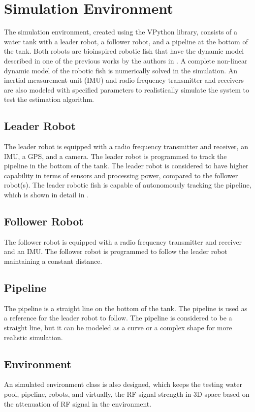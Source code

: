 \documentclass{ifacconf}
\begin{document}
\section{Simulation Environment}
The simulation environment, created using the VPython library, consists of a water tank with a leader robot, a follower robot, and a pipeline at the bottom of the tank. Both robots are bioinspired robotic fish that have the dynamic model described in one of the previous works by the authors in \cite{Masood2025}. A complete non-linear dynamic model of the robotic fish is numerically solved in the simulation. An inertial measurement unit (IMU) and radio frequency transmitter and receivers are also modeled with specified parameters to realistically simulate the system to test the estimation algorithm. 

\subsection{Leader Robot}
The leader robot is equipped with a radio frequency transmitter and receiver, an IMU, a GPS, and a camera. The leader robot is programmed to track the pipeline in the bottom of the tank. The leader robot is considered to have higher capability in terms of sensors and processing power, compared to the follower robot(s). The leader robotic fish is capable of autonomously tracking the pipeline, which is shown in detail in \cite{Masood2025}. 
\subsection{Follower Robot}
The follower robot is equipped with a radio frequency transmitter and receiver and an IMU. The follower robot is programmed to follow the leader robot maintaining a constant distance. 
\subsection{Pipeline}
The pipeline is a straight line on the bottom of the tank. The pipeline is used as a reference for the leader robot to follow. The pipeline is considered to be a straight line, but it can be modeled as a curve or a complex shape for more realistic simulation.

\subsection{Environment}
An simulated environment class is also designed, which keeps the testing water pool, pipeline, robots, and virtually, the RF signal strength in 3D space based on the attenuation of RF signal in the environment.
\end{document}
